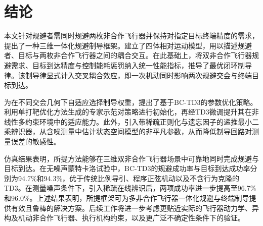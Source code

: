 \section{结论}
本文针对规避者需同时规避两枚非合作飞行器并保持对指定目标终端精度的需求，提出了一种三维一体化规避制导框架。建立了四体相对运动模型，用以描述规避者、目标与两枚非合作飞行器之间的耦合交互。在此基础上，将双非合作飞行器规避需求、目标到达精度与控制能耗惩罚纳入统一性能指标，推导了最优闭环制导律。该制导律显式计入交叉耦合效应，即一次机动同时影响两次规避交会与终端目标到达。

为在不同交会几何下自适应选择制导权重，提出了基于BC-TD3的参数优化策略。利用单打靶优化方法生成的专家示范对策略进行初始化，再经TD3微调提升其在非线性多约束环境中的适应能力。此外，引入带稀疏正则化与遗忘因子的递推最小二乘辨识器，从含噪测量中估计状态空间模型的非平凡参数，从而降低制导回路对测量误差的敏感性。

仿真结果表明，所提方法能够在三维双非合作飞行器场景中可靠地同时完成规避与目标到达。在无噪声蒙特卡洛试验中，BC-TD3的规避成功率与目标到达成功率分别为94.7\%和94.3\%，优于传统比例导引、程序正弦机动以及不含行为克隆的TD3。在测量噪声条件下，引入稀疏在线辨识后，两项成功率进一步提高至96.7\%和96.0\%。上述结果表明，所提框架可为多非合作飞行器一体化规避与终端制导提供有效且鲁棒的解决方案。后续工作将进一步考虑更贴近实际的飞行器动力学、异构及机动非合作飞行器、执行机构约束，以及更广泛不确定性条件下的验证。
